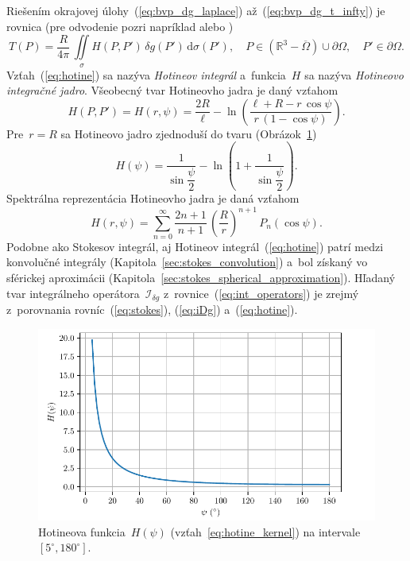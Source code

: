 \documentclass[a4paper, 12pt]{book}
\newcommand{\diff}{\mathrm d}
\begin{document}
Riešením okrajovej úlohy~(\ref{eq:bvp_dg_laplace}) až~(\ref{eq:bvp_dg_t_infty}) 
je rovnica (pre odvodenie pozri napríklad \cite{MoritzPhysicalGeodesy} alebo 
\cite{SansoGeoidDetermination})
%
\begin{equation}
\label{eq:hotine}
T(P) = \frac{R}{4\pi} \, \iint\limits_{\sigma} H(P, P') \, \delta g(P') \, 
\diff \sigma(P'){,} \quad P \in \left( \mathbb{R}^3 - \overline\Omega \right) 
\cup \partial\Omega{,} \quad P' \in \partial\Omega{.}
\end{equation}
%
Vzťah~(\ref{eq:hotine}) sa nazýva \emph{Hotineov integrál} a~funkcia~$H$ sa 
nazýva \emph{Hotineovo integračné jadro}.  Všeobecný tvar Hotineovho jadra je 
daný vzťahom \parencite{SansoGeoidDetermination}
%
\begin{equation}
\label{eq:hotine_kernel_general}
H(P, P') = H(r, \psi) = \frac{2R}{\ell} - \ln\left(\frac{\ell + R - r \, 
\cos\psi}{r \, (1 - \cos\psi)}\right){.}
\end{equation}
%
Pre~$r = R$ sa Hotineovo jadro zjednoduší do tvaru 
(Obrázok~\ref{fig:hotine_kernel})
%
\begin{equation}
\label{eq:hotine_kernel}
H(\psi) = \frac{1}{\sin\dfrac{\psi}{2}} - \ln\left( 
1 + \frac{1}{\sin\dfrac{\psi}{2}} \right){.}
\end{equation}
%
Spektrálna reprezentácia Hotineovho jadra je daná vzťahom
%
\begin{equation}
\label{eq:hotine_spectral}
H(r, \psi) = \sum_{n = 0}^{\infty} \frac{2n + 1}{n + 1} \, \left( \frac{R}{r} 
\right)^{n + 1} \, P_n(\cos\psi){.}
\end{equation}
%
Podobne ako Stokesov integrál, aj Hotineov integrál~(\ref{eq:hotine}) patrí 
medzi konvolučné integrály (Kapitola~\ref{sec:stokes_convolution}) a~bol 
získaný vo sférickej aproximácii 
(Kapitola~\ref{sec:stokes_spherical_approximation}).  Hľadaný tvar integrálneho 
operátora~$\mathcal{I}_{\delta g}$ z~rovnice~(\ref{eq:int_operators}) je zrejmý 
z~porovnania rovníc~(\ref{eq:stokes}), (\ref{eq:iDg}) a~(\ref{eq:hotine}).

\begin{figure}[bt]
\centering
\includegraphics{./fig-hotine-kernel.pdf}
\caption{Hotineova funkcia~$H(\psi)$ (vzťah~\ref{eq:hotine_kernel}) na 
intervale~$[5^\circ, 180^\circ]$.}
\label{fig:hotine_kernel}
\end{figure}
\end{document}
